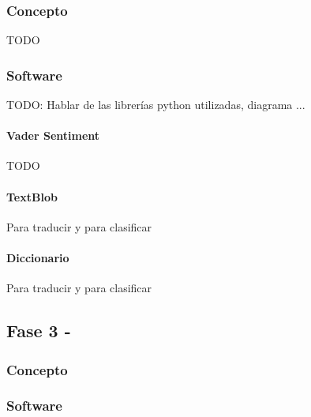 \documentclass[../all.tex]{subfiles}
\begin{document}
    \subsubsection{Concepto}
            {\color{red} 
                TODO
            }
    \subsubsection{Software}
        {\color{red} 
        TODO: Hablar de las librerías python utilizadas, diagrama ...
        }
        \paragraph{Vader Sentiment}
            {\color{red} 
                TODO
            }
        \paragraph{TextBlob}
            {\color{red} 
            Para traducir y para clasificar
            }
        \paragraph{Diccionario}
            {\color{red} 
            Para traducir y para clasificar
            }
\newpage
\subsection{Fase 3 - }
    \subsubsection{Concepto}

    \subsubsection{Software}
\end{document}
